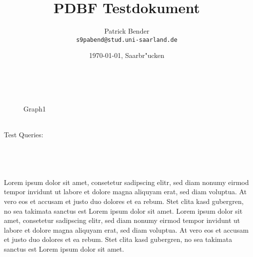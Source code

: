 \documentclass[10pt]{scrartcl}
\title{PDBF Testdokument}
\author{
 Patrick Bender\\
  \texttt{s9pabend@stud.uni-saarland.de}
}
\date{\today{}, Saarbr"ucken}
\begin{document}
\maketitle
\begin{wrapfigure}{r}{0.47\textwidth}
{ \centering %
%
\\ }
\vspace{-5pt}
\caption{Graph1}
\vspace{-20pt}
\end{wrapfigure} ~\\
Test Queries:\\[3pt]
\\[3pt]
\\[3pt]
\\
\\[8pt]
Lorem ipsum  dolor sit amet, consetetur sadipscing elitr, sed diam nonumy eirmod tempor invidunt ut labore et dolore magna aliquyam erat, sed diam voluptua. At vero eos et accusam et justo duo dolores et ea rebum. Stet clita kasd gubergren, no sea takimata sanctus est Lorem ipsum dolor sit amet. Lorem ipsum dolor sit amet, consetetur sadipscing elitr, sed diam nonumy eirmod tempor invidunt ut labore et dolore magna aliquyam erat, sed diam voluptua. At vero eos et accusam et justo duo dolores et ea rebum. Stet clita kasd gubergren, no sea takimata sanctus est Lorem ipsum dolor sit amet.\\
\end{document}
